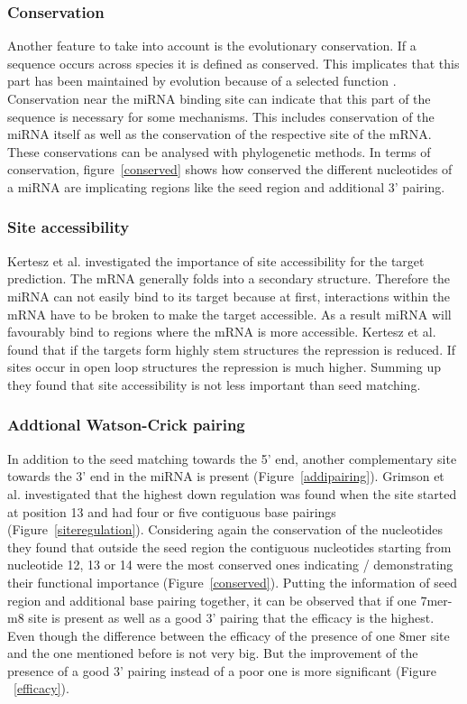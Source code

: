 \documentclass[12pt]{article}
\begin{document}
\subsubsection{Conservation}
Another feature to take into account is the evolutionary conservation. If a sequence occurs across species it is defined as conserved. This implicates that this part has been maintained by evolution because of a selected function \cite{Peterson}. Conservation near the miRNA binding site can indicate that this part of the sequence is necessary for some mechanisms. This includes conservation of the miRNA itself as well as the conservation of the respective site of the mRNA. These conservations can be analysed with phylogenetic methods. In terms of conservation, figure~\ref{conserved} shows how conserved the different nucleotides of a miRNA are implicating regions like the seed region and additional 3' pairing. 


\subsubsection{Site accessibility}
Kertesz et al. \cite{Kertesz} investigated the importance of site accessibility for the target prediction. The mRNA generally folds into a secondary structure. Therefore the miRNA can not easily bind to its target because at first, interactions within the mRNA have to be broken to make the target accessible. As a result miRNA will favourably bind to regions where the mRNA is more accessible. Kertesz et al. \cite{Kertesz} found that if the targets form highly stem structures the repression is reduced. If sites occur in open loop structures the repression is much higher. Summing up they found that site accessibility is not less important than seed matching. \\


\subsubsection{Addtional Watson-Crick pairing}
In addition to the seed matching towards the 5' end, another complementary site towards the 3' end in the miRNA is present (Figure~\ref{addipairing}). Grimson et al. \cite{Grimson} investigated that the highest down regulation was found when the site started at position 13 and had four or five contiguous base pairings (Figure~\ref{siteregulation}). Considering again the conservation of the nucleotides they found that outside the seed region the contiguous nucleotides starting from nucleotide 12, 13 or 14 were the most conserved ones indicating / demonstrating their functional importance (Figure~\ref{conserved}). Putting the information of seed region and additional base pairing together, it can be observed that if one 7mer-m8 site is present as well as a good 3' pairing that the efficacy is the highest. Even though the difference between the efficacy of the presence of one 8mer site and the one mentioned before is not very big. But the improvement of the presence of a good 3' pairing instead of a poor one is more significant (Figure ~\ref{efficacy}).   
\end{document}
